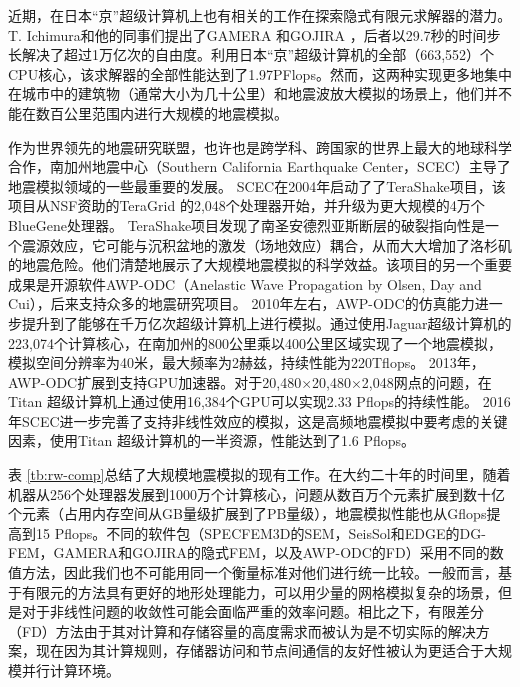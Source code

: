 \documentclass[degree=doctor]{thuthesis}
\begin{document}
近期，在日本“京”超级计算机上也有相关的工作在探索隐式有限元求解器的潜力。 T. Ichimura和他的同事们提出了GAMERA \citep {ichimura2014physics}和GOJIRA \citep {ichimura2015implicit}，后者以29.7秒的时间步长解决了超过1万亿次的自由度。利用日本“京”超级计算机的全部（663,552）个CPU核心，该求解器的全部性能达到了1.97PFlops。然而，这两种实现更多地集中在城市中的建筑物（通常大小为几十公里）和地震波放大模拟的场景上，他们并不能在数百公里范围内进行大规模的地震模拟。

作为世界领先的地震研究联盟，也许也是跨学科、跨国家的世界上最大的地球科学合作，南加州地震中心（Southern California Earthquake Center，SCEC）主导了地震模拟领域的一些最重要的发展。 SCEC在2004年启动了了TeraShake项目，该项目从NSF资助的TeraGrid \citep{teragrid}的2,048个处理器开始，并升级为更大规模的4万个BlueGene处理器。 TeraShake项目发现了南圣安德烈亚斯断层的破裂指向性是一个震源效应，它可能与沉积盆地的激发（场地效应）耦合，从而大大增加了洛杉矶的地震危险。他们清楚地展示了大规模地震模拟的科学效益。该项目的另一个重要成果是开源软件AWP-ODC（Anelastic Wave Propagation by Olsen, Day and Cui），后来支持众多的地震研究项目。 2010年左右，AWP-ODC的仿真能力进一步提升到了能够在千万亿次超级计算机上进行模拟\citep{cui2010scalable}。通过使用Jaguar超级计算机的223,074个计算核心，在南加州的800公里乘以400公里区域实现了一个地震模拟，模拟空间分辨率为40米，最大频率为2赫兹，持续性能为220Tflops。 2013年，AWP-ODC扩展到支持GPU加速器。对于20,480×20,480×2,048网点的问题，在Titan \citep {cui2013physics}超级计算机上通过使用16,384个GPU可以实现2.33 Pflops的持续性能。 2016年SCEC进一步完善了支持非线性效应的模拟，这是高频地震模拟中要考虑的关键因素，使用Titan \citep {roten2016high}超级计算机的一半资源，性能达到了1.6 Pflops。

表 \ref{tb:rw-comp}总结了大规模地震模拟的现有工作。在大约二十年的时间里，随着机器从256个处理器发展到1000万个计算核心，问题从数百万个元素扩展到数十亿个元素（占用内存空间从GB量级扩展到了PB量级），地震模拟性能也从Gflops提高到15 Pflops。不同的软件包（SPECFEM3D的SEM，SeisSol和EDGE的DG-FEM，GAMERA和GOJIRA的隐式FEM，以及AWP-ODC的FD）采用不同的数值方法，因此我们也不可能用同一个衡量标准对他们进行统一比较。一般而言，基于有限元的方法具有更好的地形处理能力，可以用少量的网格模拟复杂的场景，但是对于非线性问题的收敛性可能会面临严重的效率问题。相比之下，有限差分（FD）方法由于其对计算和存储容量的高度需求而被认为是不切实际的解决方案，现在因为其计算规则，存储器访问和节点间通信的友好性被认为更适合于大规模并行计算环境。
\end{document}

